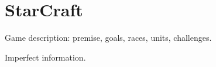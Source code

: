 \chapter{StarCraft}
Game description: premise, goals, races, units, challenges.

Imperfect information.